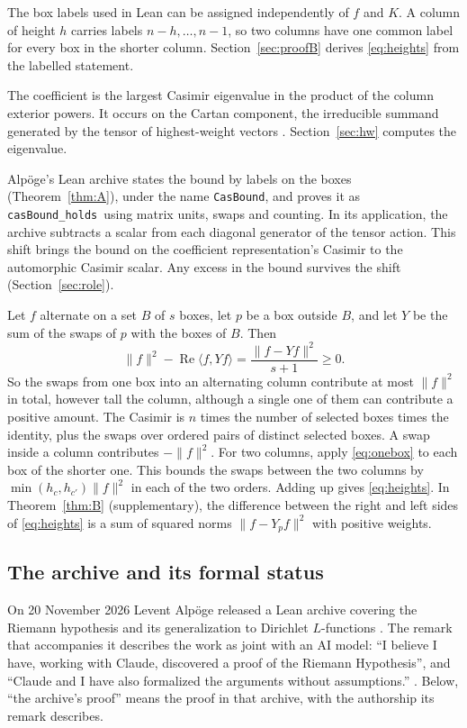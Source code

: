 \documentclass[11pt]{amsart}
\newcommand{\lean}[1]{\texttt{#1}}
\newcommand{\notlean}{supplementary}
\DeclareRobustCommand{\casboundname}{\texttt{casBound\_holds}}
\theoremstyle{definition}
\theoremstyle{remark}
\begin{document}
The box labels used in Lean can be assigned independently of \(f\) and
\(K\). A column of height \(h\) carries labels \(n-h,\ldots,n-1\), so two
columns have one common label for every box in the shorter column.
Section~\ref{sec:proofB} derives \eqref{eq:heights} from the labelled statement.

The coefficient is the largest Casimir eigenvalue in the product of the
column exterior powers. It occurs on the Cartan component, the irreducible
summand generated by the tensor of highest-weight vectors
\cite[\S 1, p.~309]{Baur}. Section~\ref{sec:hw} computes the eigenvalue.

Alp\"oge's Lean archive states the bound by labels on the boxes
(Theorem~\ref{thm:A}), under the name \lean{CasBound}, and proves it as
\casboundname\ using matrix units, swaps and counting. In its application,
the archive subtracts a scalar from each diagonal generator of the tensor
action. This shift brings the bound on the coefficient representation's
Casimir to the automorphic Casimir scalar. Any excess in the bound survives
the shift (Section~\ref{sec:role}).

Let \(f\) alternate on a set \(B\) of \(s\) boxes, let \(p\) be a box outside
\(B\), and let \(Y\) be the sum of the swaps of \(p\) with the boxes of \(B\).
Then
\begin{equation}\label{eq:onebox}
\|f\|^2-\operatorname{Re}\langle f,Yf\rangle=\frac{\|f-Yf\|^2}{s+1}\ge0 .
\end{equation}
So the swaps from one box into an alternating column contribute at most
\(\|f\|^2\) in total, however tall the column, although a single one of them
can contribute a positive amount. The Casimir is \(n\) times the number of
selected boxes times the identity, plus the swaps over ordered pairs of
distinct selected boxes. A swap inside a column contributes \(-\|f\|^2\). For two
columns, apply \eqref{eq:onebox} to each box of the shorter one. This bounds
the swaps between the two columns by \(\min(h_c,h_{c'})\|f\|^2\) in each of the
two orders. Adding up gives \eqref{eq:heights}. In Theorem~\ref{thm:B} (\notlean),
the difference between the right and left sides of \eqref{eq:heights}
is a sum of squared norms \(\|f-Y_pf\|^2\) with positive weights.

\subsection{The archive and its formal status}

On 20 November 2026 Levent Alp\"oge released a Lean archive covering the
Riemann hypothesis and its generalization to Dirichlet \(L\)-functions
\cite{JointStatement,AlpogeArchive}. The remark that
accompanies it describes the work as joint with an AI model: ``I believe I
have, working with Claude, discovered a proof of the Riemann Hypothesis'', and
``Claude and I have also formalized the arguments without assumptions.'' \cite{AlpogeRemark}. Below,
``the archive's proof'' means the proof in that archive, with the authorship its
remark describes.
\end{document}
